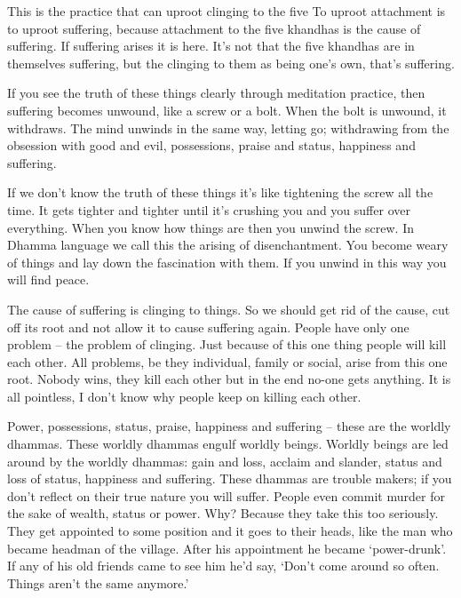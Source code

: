 This is the practice that can uproot clinging to the five  To uproot attachment is to uproot suffering, because attachment to the five khandhas is the cause of suffering. If suffering arises it is here. It's not that the five khandhas are in themselves suffering, but the clinging to them as being one's own, that's suffering.

If you see the truth of these things clearly through meditation practice, then suffering becomes unwound, like a screw or a bolt. When the bolt is unwound, it withdraws. The mind unwinds in the same way, letting go; withdrawing from the obsession with good and evil, possessions, praise and status, happiness and suffering.

If we don't know the truth of these things it's like tightening the screw all the time. It gets tighter and tighter until it's crushing you and you suffer over everything. When you know how things are then you unwind the screw. In Dhamma language we call this the arising of  disenchantment. You become weary of things and lay down the fascination with them. If you unwind in this way you will find peace.

The cause of suffering is clinging to things. So we should get rid of the cause, cut off its root and not allow it to cause suffering again. People have only one problem -- the problem of clinging. Just because of this one thing people will kill each other. All problems, be they individual, family or social, arise from this one root. Nobody wins, they kill each other but in the end no-one gets anything. It is all pointless, I don't know why people keep on killing each other.

Power, possessions, status, praise, happiness and suffering -- these are the worldly dhammas. These worldly dhammas engulf worldly beings. Worldly beings are led around by the worldly dhammas: gain and loss, acclaim and slander, status and loss of status, happiness and suffering. These dhammas are trouble makers; if you don't reflect on their true nature you will suffer. People even commit murder for the sake of wealth, status or power. Why? Because they take this too seriously. They get appointed to some position and it goes to their heads, like the man who became headman of the village. After his appointment he became `power-drunk'. If any of his old friends came to see him he'd say, `Don't come around so often. Things aren't the same anymore.'

